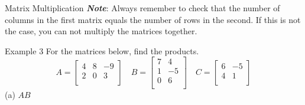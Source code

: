 \documentclass[t]{beamer}
\begin{document}
\begin{frame}{Matrix Multiplication}
\emph{{\color{blue}\textbf{Note}}}: Always remember to check that the number of columns in the first matrix equals the number of rows in the second. If this is not the case, you can not multiply the matrices together.
\end{frame}

\begin{frame}{Example 3}
For the matrices below, find the products.
\[
A =
\begin{bmatrix}
4   &   8   &   -9  \\
2   &   0   &   3   \\
\end{bmatrix}
\quad
B =
\begin{bmatrix}
7   &   4   \\
1   &   -5  \\
0   &   6   \\
\end{bmatrix}
\quad
C = 
\begin{bmatrix}
6   &   -5  \\
4   &   1   \\
\end{bmatrix}
\]
(a) \quad $AB$
\end{frame}
\end{document}
